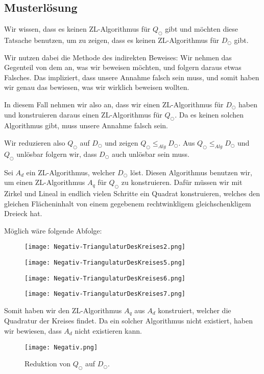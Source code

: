 \documentclass[
	12pt, %
	german, %
]{fphw}
\begin{document}

\subsection*{Musterlösung}

Wir wissen, dass es keinen ZL-Algorithmus für \(Q_{\bigcirc}\) gibt und möchten diese Tatsache benutzen, um zu zeigen, dass es keinen ZL-Algorithmus für \(D_{\bigcirc}\) gibt.

Wir nutzen dabei die Methode des indirekten Beweises: Wir nehmen das Gegenteil von dem an, was wir beweisen möchten, und folgern daraus etwas Falsches. Das impliziert, dass unsere Annahme falsch sein muss, und somit haben wir genau das bewiesen, was wir wirklich beweisen wollten.

In diesem Fall nehmen wir also an, dass wir einen ZL-Algorithmus für \(D_{\bigcirc}\) haben und konstruieren daraus einen ZL-Algorithmus für \(Q_{\bigcirc}\). Da es keinen solchen Algorithmus gibt, muss unsere Annahme falsch sein.

Wir reduzieren also \(Q_{\bigcirc}\) auf \(D_{\bigcirc}\) und zeigen \(Q_{\bigcirc} \leq_{Alg} D_{\bigcirc}\). Aus \(Q_{\bigcirc} \leq_{Alg} D_{\bigcirc}\) und \(Q_{\bigcirc}\) unlösbar folgern wir, dass \(D_{\bigcirc}\) auch unlösbar sein muss.

Sei \(A_d\) ein ZL-Algorithmus, welcher \(D_{\bigcirc}\) löst. Diesen Algorithmus benutzen wir, um einen ZL-Algorithmus \(A_q\) für \(Q_{\bigcirc}\) zu konstruieren. Dafür müssen wir mit Zirkel und Lineal in endlich vielen Schritte ein Quadrat konstruieren, welches den gleichen Flächeninhalt von einem gegebenem rechtwinkligem gleichschenkligem Dreieck hat.

Möglich wäre folgende Abfolge:
\begin{figure}[H]
	\centering
	\texttt{[image: Negativ-TriangulaturDesKreises2.png]}
\end{figure}
\begin{figure}[H]
	\centering
	\texttt{[image: Negativ-TriangulaturDesKreises5.png]}
\end{figure}\begin{figure}[H]
	\centering
	\texttt{[image: Negativ-TriangulaturDesKreises6.png]}
\end{figure}\begin{figure}[H]
	\centering
	\texttt{[image: Negativ-TriangulaturDesKreises7.png]}
\end{figure}

Somit haben wir den ZL-Algorithmus \(A_q\) aus \(A_d\) konstruiert, welcher die Quadratur der Kreises findet. Da ein solcher Algorithmus nicht existiert, haben wir bewiesen, dass \(A_d\) nicht existieren kann.
\begin{figure}[H]
	\centering
	\texttt{[image: Negativ.png]}
	\caption{Reduktion von \(Q_{\bigcirc}\) auf \(D_{\bigcirc}\).}
\end{figure}
\end{document}
